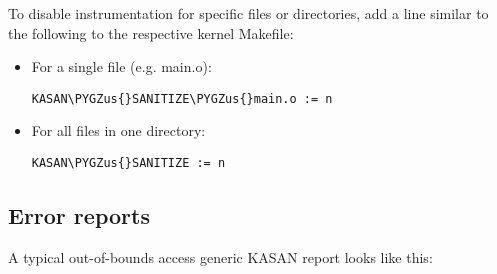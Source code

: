 \documentclass[a4paper,8pt,english]{sphinxmanual}
\def\PYGZus{\char`\_}
\begin{document}
To disable instrumentation for specific files or directories, add a line
similar to the following to the respective kernel Makefile:
\begin{itemize}
\item {} 
For a single file (e.g. main.o):

\begin{Verbatim}[commandchars=\\\{\}]
KASAN\PYGZus{}SANITIZE\PYGZus{}main.o := n
\end{Verbatim}

\item {} 
For all files in one directory:

\begin{Verbatim}[commandchars=\\\{\}]
KASAN\PYGZus{}SANITIZE := n
\end{Verbatim}

\end{itemize}


\subsection{Error reports}
\label{dev-tools/kasan:error-reports}
A typical out-of-bounds access generic KASAN report looks like this:
\end{document}
